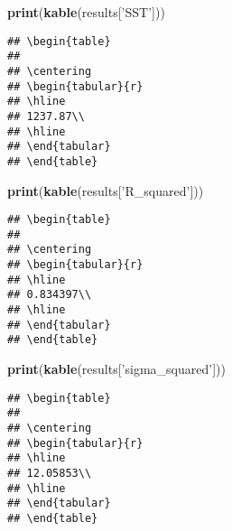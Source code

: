\documentclass[]{article}
\newenvironment{Shaded}{\begin{snugshade}}{\end{snugshade}}
\newcommand{\KeywordTok}[1]{\textcolor[rgb]{0.13,0.29,0.53}{\textbf{#1}}}
\newcommand{\StringTok}[1]{\textcolor[rgb]{0.31,0.60,0.02}{#1}}
\newcommand{\NormalTok}[1]{#1}
\begin{document}
\begin{Shaded}
\begin{Highlighting}[]
\KeywordTok{print}\NormalTok{(}\KeywordTok{kable}\NormalTok{(results[}\StringTok{'SST'}\NormalTok{]))}
\end{Highlighting}
\end{Shaded}

\begin{verbatim}
## \begin{table}
## 
## \centering
## \begin{tabular}{r}
## \hline
## 1237.87\\
## \hline
## \end{tabular}
## \end{table}
\end{verbatim}

\begin{Shaded}
\begin{Highlighting}[]
\KeywordTok{print}\NormalTok{(}\KeywordTok{kable}\NormalTok{(results[}\StringTok{'R_squared'}\NormalTok{]))}
\end{Highlighting}
\end{Shaded}

\begin{verbatim}
## \begin{table}
## 
## \centering
## \begin{tabular}{r}
## \hline
## 0.834397\\
## \hline
## \end{tabular}
## \end{table}
\end{verbatim}

\begin{Shaded}
\begin{Highlighting}[]
\KeywordTok{print}\NormalTok{(}\KeywordTok{kable}\NormalTok{(results[}\StringTok{'sigma_squared'}\NormalTok{]))}
\end{Highlighting}
\end{Shaded}

\begin{verbatim}
## \begin{table}
## 
## \centering
## \begin{tabular}{r}
## \hline
## 12.05853\\
## \hline
## \end{tabular}
## \end{table}
\end{verbatim}
\end{document}

